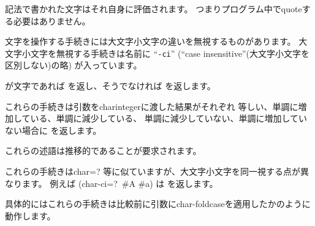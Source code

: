 \sharpsign\backwhack{} 記法で書かれた文字はそれ自身に評価されます。
つまりプログラム中でquoteする必要はありません。

\vest 文字を操作する手続きには大文字小文字の違いを無視するものがあります。
大文字小文字を無視する手続きは名前に
\hbox{``{\tt -ci}''} (``case insensitive''(大文字小文字を区別しない)の略) が入っています。


\begin{entry}{%
}

が文字であれば \schtrue{}を返し、そうでなければ \schfalse{}を返します。

\end{entry}


\begin{entry}{%
}

\label{characterequality}

これらの手続きは引数を{\cf char\coerce{}integer}に渡した結果がそれぞれ
等しい、単調に増加している、単調に減少している、
単調に減少していない、単調に増加していない場合に %
\schtrue{}を返します。

これらの述語は推移的であることが要求されます。

\end{entry}


\begin{entry}{%
}

これらの手続きは{\cf char=?} 等に似ていますが、大文字小文字を同一視する点が異なります。
例えば {\cf (char-ci=?\ \#\backwhack{}A \#\backwhack{}a)} は \schtrue{}を返します。

具体的にはこれらの手続きは比較前に引数に{\cf char-foldcase}を適用したかのように動作します。

\end{entry}


